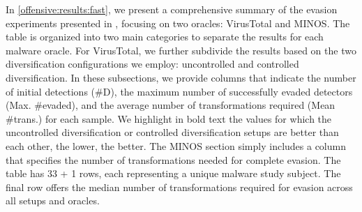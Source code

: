 In \autoref{offensive:results:fast}, we present a comprehensive summary of the evasion experiments presented in \cite{EVASION}, focusing on two oracles: VirusTotal and MINOS\cite{MINOS}. The table is organized into two main categories to separate the results for each malware oracle. 
For VirusTotal, we further subdivide the results based on the two diversification configurations we employ: uncontrolled and controlled diversification. 
In these subsections, we provide columns that indicate the number of initial detections (\#D), the maximum number of successfully evaded detectors (Max. \#evaded), and the average number of transformations required (Mean \#trans.) for each sample. 
We highlight in bold text the values for which the uncontrolled diversification or controlled diversification setups are better than each other, the lower, the better.
The MINOS section simply includes a column that specifies the number of transformations needed for complete evasion. 
The table has 33 + 1 rows, each representing a unique \wasm malware study subject. 
The final row offers the median number of transformations required for evasion across all setups and oracles. 

